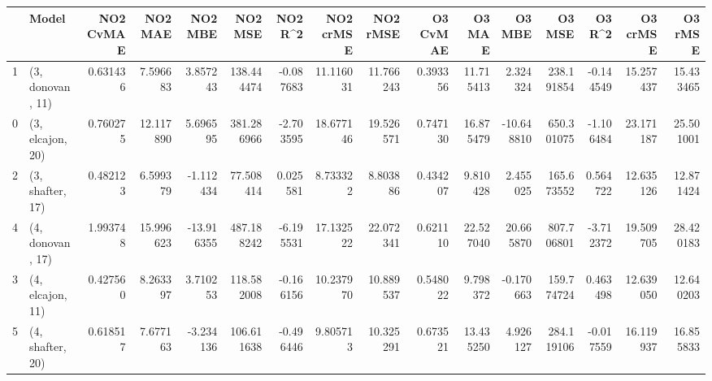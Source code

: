 \begin{tabular}{llrrrrrrrrrrrrrr}
\toprule
{} &             Model &  NO2 CvMAE &    NO2 MAE &    NO2 MBE &     NO2 MSE &   NO2 R\textasciicircum2 &  NO2 crMSE &   NO2 rMSE &  O3 CvMAE &     O3 MAE &     O3 MBE &      O3 MSE &    O3 R\textasciicircum2 &   O3 crMSE &    O3 rMSE \\
\midrule
1 &  (3, donovan, 11) &   0.631436 &   7.596683 &   3.857243 &  138.444474 & -0.087683 &  11.116031 &  11.766243 &  0.393356 &  11.715413 &   2.324324 &  238.191854 & -0.144549 &  15.257437 &  15.433465 \\
0 &  (3, elcajon, 20) &   0.760275 &  12.117890 &   5.696595 &  381.286966 & -2.703595 &  18.677146 &  19.526571 &  0.747130 &  16.875479 & -10.648810 &  650.301075 & -1.106484 &  23.171187 &  25.501001 \\
2 &  (3, shafter, 17) &   0.482123 &   6.599379 &  -1.112434 &   77.508414 &  0.025581 &   8.733322 &   8.803886 &  0.434207 &   9.810428 &   2.455025 &  165.673552 &  0.564722 &  12.635126 &  12.871424 \\
4 &  (4, donovan, 17) &   1.993748 &  15.996623 & -13.916355 &  487.188242 & -6.195531 &  17.132522 &  22.072341 &  0.621110 &  22.527040 &  20.665870 &  807.706801 & -3.712372 &  19.509705 &  28.420183 \\
3 &  (4, elcajon, 11) &   0.427560 &   8.263397 &   3.710253 &  118.582008 & -0.166156 &  10.237970 &  10.889537 &  0.548022 &   9.798372 &  -0.170663 &  159.774724 &  0.463498 &  12.639050 &  12.640203 \\
5 &  (4, shafter, 20) &   0.618517 &   7.677163 &  -3.234136 &  106.611638 & -0.496446 &   9.805713 &  10.325291 &  0.673521 &  13.435250 &   4.926127 &  284.119106 & -0.017559 &  16.119937 &  16.855833 \\
\bottomrule
\end{tabular}
